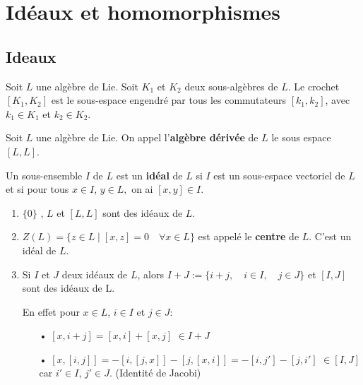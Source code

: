 \documentclass[a4paper,openany,12pt]{report}
\theoremstyle{break}
{\theorembodyfont{\upshape}
\newtheorem*{rmq}{Remarque :}
\newtheorem*{prv}{Preuve :}
\newtheorem*{ex}{Exemples :}
\newtheorem*{exe}{Exemple : }
\newtheorem*{nota}{Notation :}
\newtheorem*{dem}{D\'emonstration :}}
\begin{document}
\section{Idéaux et homomorphismes}

\subsection{Ideaux}

\begin{df}
\quad Soit $L$ une algèbre de Lie. Soit $K_1$ et $K_2$ deux sous-algèbres de $L$. Le crochet $[K_1,K_2]$ est le sous-espace engendré par tous les commutateurs $[k_1,k_2]$, avec $k_1 \in K_1$ et $k_2 \in K_2$.
\end{df}

\begin{df}
\quad Soit $L$ une algèbre de Lie. On appel l'\textbf{algèbre dérivée} de $L$ le sous espace $[L,L]$.
\end{df}

\begin{df}
\quad Un sous-ensemble $I$ de $L$ est un \textbf{idéal} de $L$ si $I$ est un sous-espace vectoriel de $L$ et si pour tous $x \in I$, $y \in L,$ on ai $[x, y] \in I$.
\end{df}

\begin{ex}
\begin{enumerate}
\item $\{0 \}$ , $L$ et $[L,L]$ sont des idéaux de $L$.

\item $Z(L) = \{ z \in L  \mid [x,z]=0 \quad \forall x \in L\}$ est appelé le \textbf{centre} de $L$. C'est un idéal de $L$.

\item Si $I$ et $J$ deux idéaux de $L$, alors $I+J:=\{i+j,\quad i\in I,\quad j\in J\}$ et $[I,J]$ sont des idéaux de L.

En effet pour $x \in L$, $i \in I$ et $j \in J$:
\begin{itemize}
\item[•] $[x,i+j]=[x,i]+[x,j]$ $\in I+J$
\item[•]$[x,[i,j]]=-[i,[j,x]]-[j,[x,i]] = -[i,j']-[j,i']$ $\in [I,J]$ car $i' \in I$, $j' \in J$. (Identité de Jacobi)
\end{itemize}
\end{enumerate}
\end{ex}
\end{document}
